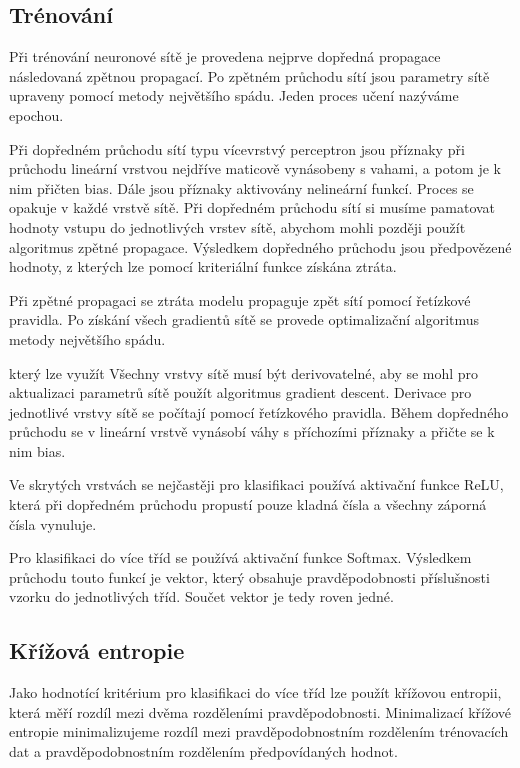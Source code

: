 \documentclass[FM,BP]{tulthesis}
\begin{document}
\subsection{Trénování}
Při trénování neuronové sítě je provedena nejprve dopředná propagace následovaná zpětnou propagací. Po zpětném průchodu sítí jsou parametry sítě upraveny pomocí metody největšího spádu. Jeden proces učení nazýváme epochou.

Při dopředném průchodu sítí typu vícevrstvý perceptron jsou příznaky při průchodu lineární vrstvou nejdříve maticově vynásobeny s vahami, a potom je k nim přičten bias. Dále jsou příznaky aktivovány nelineární funkcí. Proces se opakuje v každé vrstvě sítě. Při dopředném průchodu sítí si musíme pamatovat hodnoty vstupu do jednotlivých vrstev sítě, abychom mohli později použít algoritmus zpětné propagace. Výsledkem dopředného průchodu jsou předpovězené hodnoty, z kterých lze pomocí kriteriální funkce získána ztráta.

Při zpětné propagaci se ztráta modelu propaguje zpět sítí pomocí řetízkové pravidla. Po získání všech gradientů sítě se provede optimalizační algoritmus metody největšího spádu. 

který lze využít Všechny vrstvy sítě musí být derivovatelné, aby se mohl pro aktualizaci parametrů sítě použít algoritmus gradient descent. Derivace pro jednotlivé vrstvy sítě se počítají pomocí řetízkového pravidla. Během dopředného průchodu se v lineární vrstvě vynásobí váhy s příchozími příznaky a přičte se k nim bias.

Ve skrytých vrstvách se nejčastěji pro klasifikaci používá aktivační funkce ReLU, která při dopředném průchodu propustí pouze kladná čísla a všechny záporná čísla vynuluje.

Pro klasifikaci do více tříd se používá aktivační funkce Softmax. Výsledkem průchodu touto funkcí je vektor, který obsahuje pravděpodobnosti příslušnosti vzorku do jednotlivých tříd. Součet vektor je tedy roven jedné.

\subsection{Křížová entropie}
Jako hodnotící kritérium pro klasifikaci do více tříd lze použít křížovou entropii, která měří rozdíl mezi dvěma rozděleními pravděpodobnosti. Minimalizací křížové entropie minimalizujeme rozdíl mezi pravděpodobnostním rozdělením trénovacích dat a pravděpodobnostním rozdělením předpovídaných hodnot.\cite{brownlee_2020}
\end{document}
